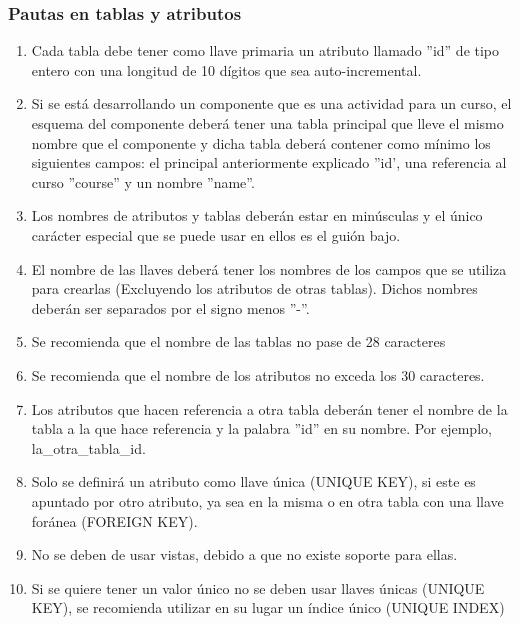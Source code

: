 \subsubsection{Pautas en tablas y atributos}
    \begin{enumerate}
        \item Cada tabla debe tener como llave primaria un atributo llamado ''id'' de tipo entero con una longitud de 10 dígitos que sea auto-incremental.
        \item Si se está desarrollando un componente que es una actividad para un curso, el esquema del componente deberá tener una tabla principal que lleve el mismo nombre que el componente y dicha tabla deberá contener como mínimo los siguientes campos: el principal anteriormente explicado ''id', una referencia al curso ''course'' y un nombre ''name''.
        \item Los nombres de atributos y tablas deberán estar en minúsculas y el único carácter especial que se puede usar en ellos es el guión bajo.
        \item El nombre de las llaves deberá tener los nombres de los campos que se utiliza para crearlas (Excluyendo los atributos de otras tablas). Dichos nombres deberán ser separados por el signo menos ''-''.
        \item Se recomienda que el nombre de las tablas no pase de 28 caracteres
        \item Se recomienda que el nombre de los atributos no exceda los 30 caracteres.
        \item Los atributos que hacen referencia a otra tabla deberán tener el nombre de la tabla a la que hace referencia y la palabra ''id'' en su nombre. Por ejemplo, la\_otra\_tabla\_id.
        \item Solo se definirá un atributo como llave única (UNIQUE KEY), si este es apuntado por otro atributo, ya sea en la misma o en otra tabla con una llave foránea (FOREIGN KEY).
        \item No se deben de usar vistas, debido a que no existe soporte para ellas.
        \item Si se quiere tener un valor único no se deben usar llaves únicas (UNIQUE KEY), se recomienda utilizar en su lugar un índice único (UNIQUE INDEX)
    \end{enumerate}


